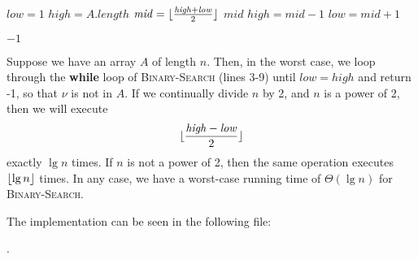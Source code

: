 
\begin{algorithmic}[1]
    \STATE $\mathit{low} = 1$
    \STATE $\mathit{high} = A.\mathit{length}$
        \STATE $\mathit{mid} = \lfloor\frac{\mathit{high} + \mathit{low}}{2}\rfloor$
            \RETURN $\mathit{mid}$
            \STATE $\mathit{high} = \mathit{mid} - 1$
        \ELSE
            \STATE $\mathit{low} = \mathit{mid} + 1$
        \ENDIF
    \ENDWHILE

    \RETURN $-1$
\end{algorithmic}

Suppose we have an array $A$ of length $n$. Then, in the worst case, we loop through
the \textbf{while} loop of \textsc{Binary-Search} (lines 3-9) until 
$\mathit{low} = \mathit{high}$ and return -1, so that $\nu$ is not in $A$. If we
continually divide $n$ by 2, and $n$ is a power of 2, then we will execute 
\[
    \lfloor\frac{\mathit{high} - \mathit{low}}{2}\rfloor
\]
exactly $\lg{n}$ times. If $n$ is not a power of 2, then the same operation
executes $\lfloor\lg{n}\rfloor$ times. In any case, we have a worst-case running time of
$\Theta(\lg{n})$ for \textsc{Binary-Search}.

The implementation can be seen in the following file:

.
